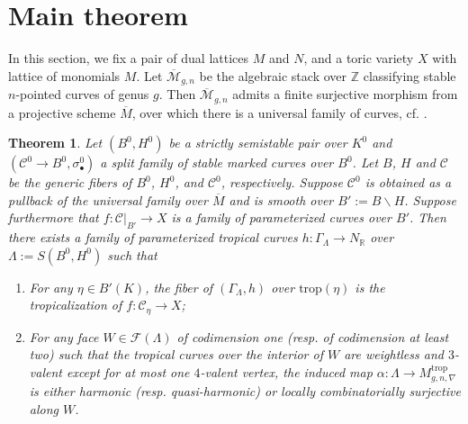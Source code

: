 \documentclass[11pt,reqno]{amsart}
\newcommand{\com}[1]{{\color{brown}$\textsuperscript{+}$\marginnote{\small #1}}}
\numberwithin{equation}{section}
\newtheorem{thm}{Theorem}[section]
\theoremstyle{definition}
\newcommand{\trop}{\mathrm{trop}}
\newcommand{\RR}{{\mathbb R}}
\newcommand{\CM}{{\mathcal M}}
\newcommand{\CF}{{\mathcal F}}
\def\:{\colon}
\newcommand{\cC}{{\mathcal{C}}}
\theoremstyle{remark}
\newtheorem{rem}[thm]{Remark}
\begin{document}
\section{Main theorem}
In this section, we fix a pair of dual lattices $M$ and $N$, and a toric variety $X$ with lattice of monomials $M$.
Let $\overline{\CM}_{g,n}$ be the algebraic stack over $\mathbb Z$ classifying stable $n$-pointed curves of genus $g$.
Then $\overline{\CM}_{g,n}$ admits a finite surjective morphism from a projective scheme $\overline{M}$, over which there is a universal family of curves, cf. \cite[\S2.24]{dJ96}.


\begin{thm}\label{thm:main thm}
Let $(B^0,H^0)$ be a strictly semistable pair over $K^0$ and $(\cC^0\rightarrow B^0,\sigma^0_\bullet)$ a split family of stable marked curves over $B^0$. Let $B$, $H$ and $\cC$ be the generic fibers of $B^0$, $H^0$, and $\cC^0$, respectively. Suppose $\cC^0$ is obtained as a pullback of the universal family over $\overline M$ and is smooth over $B':=B\backslash H$. Suppose furthermore that $f \colon \cC|_{B'} \rightarrow X$ is a family of parameterized curves over $B'$. Then there exists a family of parameterized tropical curves $h\: \Gamma_\Lambda\to N_\RR$ over $\Lambda:=S(B^0,H^0)$ such that 
\begin{enumerate}
\item For any $\eta \in B'(K)$, the fiber of $(\Gamma_\Lambda, h)$ over $\trop(\eta)$ is the tropicalization of $f\:\cC_\eta\to X$;%
\item For any face $W\in\CF(\Lambda)$ of codimension one (resp. of codimension at least two) such that the tropical curves over the interior of $W$ are weightless and $3$-valent except for at most one $4$-valent vertex, 
the induced map $\alpha\:\Lambda\to M^{\trop}_{g,n,\nabla}$ is either harmonic (resp. quasi-harmonic) or locally combinatorially surjective along $W$.
\end{enumerate}
\end{thm}

\end{document}
